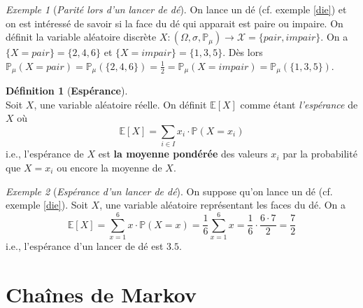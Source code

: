 \documentclass[12pt,a4paper]{report}
\theoremstyle{definition}%
\newtheorem{definition}{Définition}[chapter]
\theoremstyle{remark}
\newtheorem{example}{Exemple}[chapter]
\newcommand{\ie}{i.e., }
\newcommand{\cf}{cf. }
\newcommand{\pr}{\mathbb{P}}
\begin{document}
\begin{example}[\textit{Parité lors d'un lancer de dé}]
	On lance un dé (\cf exemple \ref{die}) et on est intéressé de savoir si la face du dé qui apparait est paire ou impaire. On définit la variable aléatoire discrète $X:(\Omega, \sigma, \pr_{\mu}) \rightarrow \mathcal{X} = \{pair, impair\}$. On a $\{X = pair\} = \{2, 4, 6\}$ et $\{X = impair\} = \{1, 3, 5\}$. Dès lors $\pr_{\mu}(X = pair) = \pr_{\mu}(\{2, 4, 6\}) =\frac{1}{2} = \pr_{\mu}(X = impair) = \pr_{\mu}(\{1, 3, 5\})$.
\end{example}

\begin{definition}[\textbf{Espérance}]\label{espmath}\cite{Course2}\\
	Soit $X$, une variable aléatoire réelle. On définit $\mathbb{E}[X]$ comme étant \textit{l'espérance} de $X$ où
	\[\mathbb{E}[X] = \sum_{i \in I}x_i \cdot \pr(X = x_i) \]
	\ie l'espérance de $X$ est \textbf{la moyenne pondérée} des valeurs $x_i$ par la probabilité que $X = x_i$ ou encore la moyenne de $X$.

\end{definition}
\begin{example}[\textit{Espérance d'un lancer de dé}]
	On suppose qu'on lance un dé (\cf exemple \ref{die}). Soit $X$, une variable aléatoire représentant les faces du dé. On a
	\[ \mathbb{E}[X] = \sum_{x = 1}^6 x \cdot \pr(X = x)  = \frac{1}{6} \sum_{x = 1}^6 x = \frac{1}{6} \cdot \frac{6 \cdot 7}{2} = \frac{7}{2}\] \ie l'espérance d'un lancer de dé est $3.5$.
\end{example}


\chapter{Chaînes de Markov}
\end{document}
